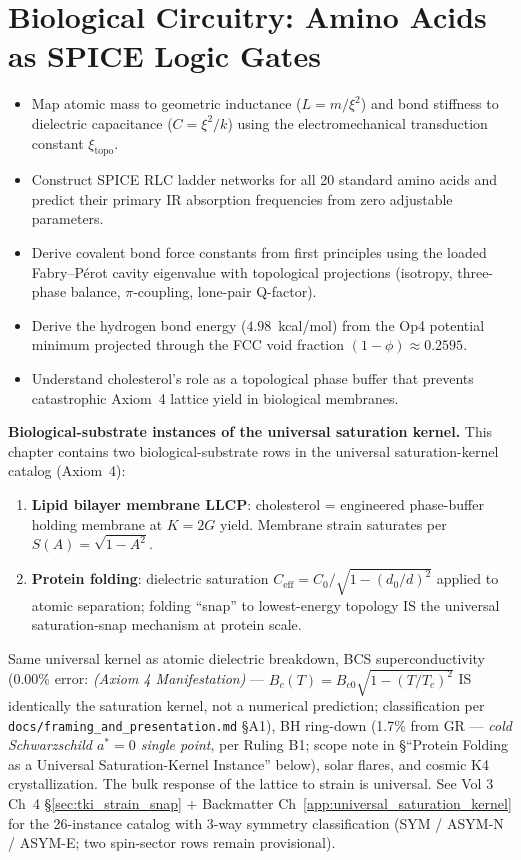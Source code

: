 \chapter{Biological Circuitry: Amino Acids as SPICE Logic Gates}
\label{ch:biological_circuitry}


\begin{objectivebox}
\begin{itemize}
    \item Map atomic mass to geometric inductance ($L = m/\xi^2$) and bond stiffness to dielectric capacitance ($C = \xi^2/k$) using the electromechanical transduction constant $\xi_{\text{topo}}$.
    \item Construct SPICE RLC ladder networks for all 20 standard amino acids and predict their primary IR absorption frequencies from zero adjustable parameters.
    \item Derive covalent bond force constants from first principles using the loaded Fabry--P\'{e}rot cavity eigenvalue with topological projections (isotropy, three-phase balance, $\pi$-coupling, lone-pair Q-factor).
    \item Derive the hydrogen bond energy ($4.98$~kcal/mol) from the Op4 potential minimum projected through the FCC void fraction $(1-\phi) \approx 0.2595$.
    \item Understand cholesterol's role as a topological phase buffer that prevents catastrophic Axiom~4 lattice yield in biological membranes.
\end{itemize}
\end{objectivebox}

\textbf{Biological-substrate instances of the universal saturation kernel.}
This chapter contains two biological-substrate rows in the universal
saturation-kernel catalog (Axiom~4):

\begin{enumerate}
    \item \textbf{Lipid bilayer membrane LLCP}: cholesterol = engineered
    phase-buffer holding membrane at $K = 2G$ yield. Membrane strain
    saturates per $S(A) = \sqrt{1 - A^2}$.
    \item \textbf{Protein folding}: dielectric saturation
    $C_{\text{eff}} = C_0 / \sqrt{1 - (d_0/d)^2}$ applied to atomic
    separation; folding ``snap'' to lowest-energy topology IS the universal
    saturation-snap mechanism at protein scale.
\end{enumerate}

Same universal kernel as atomic dielectric breakdown, BCS superconductivity
(0.00\% error: \emph{(Axiom 4 Manifestation)} --- $B_c(T) = B_{c0}\sqrt{1-(T/T_c)^2}$
IS identically the saturation kernel, not a numerical prediction; classification per
\texttt{docs/framing\_and\_presentation.md} \S A1), BH ring-down (1.7\% from
GR --- \emph{cold Schwarzschild $a^{*} = 0$ single point}, per Ruling B1; scope
note in \S``Protein Folding as a Universal Saturation-Kernel Instance''
below), solar flares, and cosmic K4 crystallization. The bulk response of the
lattice to strain is universal. See Vol 3 Ch~4 \S\ref{sec:tki_strain_snap}
+ Backmatter Ch~\ref{app:universal_saturation_kernel} for the 26-instance
catalog with 3-way symmetry classification (SYM / ASYM-N / ASYM-E; two
spin-sector rows remain provisional).

